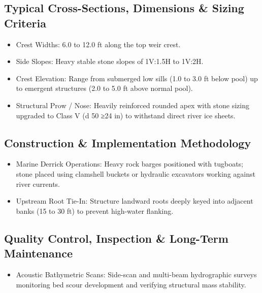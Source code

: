 \documentclass[
  letterpaper,
  DIV=11,
  numbers=noendperiod]{scrreprt}
\providecommand{\tightlist}{%
  \setlength{\itemsep}{0pt}\setlength{\parskip}{0pt}}
\begin{document}
\subsection{Typical Cross-Sections, Dimensions \& Sizing
Criteria}\label{typical-cross-sections-dimensions-sizing-criteria-9}

\begin{itemize}
\item
  Crest Widths: 6.0 to 12.0 ft along the top weir crest.
\item
  Side Slopes: Heavy stable stone slopes of 1V:1.5H to 1V:2H.
\item
  Crest Elevation: Range from submerged low sills (1.0 to 3.0 ft below
  pool) up to emergent structures (2.0 to 5.0 ft above normal pool).
\item
  Structural Prow / Nose: Heavily reinforced rounded apex with stone
  sizing upgraded to Class V (d 50 ≥24 in) to withstand direct river ice
  sheets.
\end{itemize}

\subsection{Construction \& Implementation
Methodology}\label{construction-implementation-methodology-12}

\begin{itemize}
\item
  Marine Derrick Operations: Heavy rock barges positioned with tugboats;
  stone placed using clamshell buckets or hydraulic excavators working
  against river currents.
\item
  Upstream Root Tie-In: Structure landward roots deeply keyed into
  adjacent banks (15 to 30 ft) to prevent high-water flanking.
\end{itemize}

\subsection{Quality Control, Inspection \& Long-Term
Maintenance}\label{quality-control-inspection-long-term-maintenance-12}

\begin{itemize}
\tightlist
\item
  Acoustic Bathymetric Scans: Side-scan and multi-beam hydrographic
  surveys monitoring bed scour development and verifying structural mass
  stability.
\end{itemize}
\end{document}
